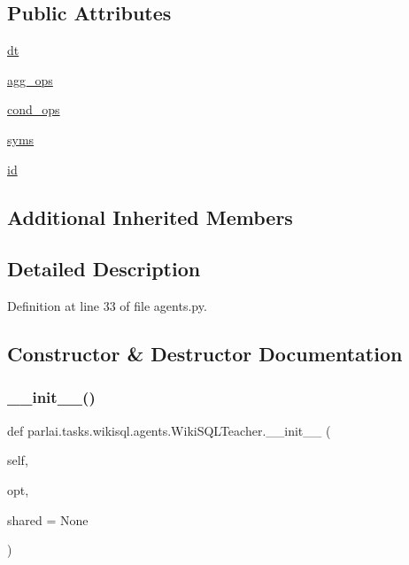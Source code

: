 \subsection*{Public Attributes}
\begin{DoxyCompactItemize}
\item 
\hyperlink{classparlai_1_1tasks_1_1wikisql_1_1agents_1_1WikiSQLTeacher_a343d704bea4fc5c096000b73b2796e03}{dt}
\item 
\hyperlink{classparlai_1_1tasks_1_1wikisql_1_1agents_1_1WikiSQLTeacher_acac9910a97f5b0ee9af7e9bd8a7e2d78}{agg\+\_\+ops}
\item 
\hyperlink{classparlai_1_1tasks_1_1wikisql_1_1agents_1_1WikiSQLTeacher_a8d6572adccf79dd778ec80ec14647980}{cond\+\_\+ops}
\item 
\hyperlink{classparlai_1_1tasks_1_1wikisql_1_1agents_1_1WikiSQLTeacher_a1a67c761791a412586131dd7dd595a7c}{syms}
\item 
\hyperlink{classparlai_1_1tasks_1_1wikisql_1_1agents_1_1WikiSQLTeacher_aec62053f23dd71f7db3997534f631136}{id}
\end{DoxyCompactItemize}
\subsection*{Additional Inherited Members}


\subsection{Detailed Description}


Definition at line 33 of file agents.\+py.



\subsection{Constructor \& Destructor Documentation}
\mbox{\label{classparlai_1_1tasks_1_1wikisql_1_1agents_1_1WikiSQLTeacher_afabbebdbb464879554723b2b3af62493}} 
\subsubsection{\texorpdfstring{\+\_\+\+\_\+init\+\_\+\+\_\+()}{\_\_init\_\_()}}
{\footnotesize\ttfamily def parlai.\+tasks.\+wikisql.\+agents.\+Wiki\+S\+Q\+L\+Teacher.\+\_\+\+\_\+init\+\_\+\+\_\+ (\begin{DoxyParamCaption}\item[{}]{self,  }\item[{}]{opt,  }\item[{}]{shared = {\ttfamily None} }\end{DoxyParamCaption})}



